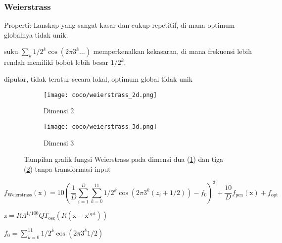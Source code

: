 \subsubsection*{Weierstrass}
\noindent Properti:
Lanskap yang sangat kasar dan cukup repetitif, di mana optimum globalnya tidak unik.
\begin{packed_item}
  \item suku $\sum_{k}^{}1/2^k\cos(2\pi 3^k\ldots)$ memperkenalkan kekasaran, di mana frekuensi lebih rendah memiliki bobot lebih besar $1/2^k$.
  \item diputar, tidak teratur secara lokal, optimum global tidak unik
\end{packed_item}
\begin{figure}[H]
	\centering
	\begin{subfigure}[b]{0.4\textwidth}
		\centering
		\texttt{[image: coco/weierstrass\_2d.png]}
		\caption{Dimensi 2}
		\label{fig:weierstrass_coco_2d}
	\end{subfigure}
	\hfill
	\begin{subfigure}[b]{0.4\textwidth}
		\centering
		\texttt{[image: coco/weierstrass\_3d.png]}
		\caption{Dimensi 3}
		\label{fig:weierstrass_coco_3d}
	\end{subfigure}
	\caption{Tampilan grafik fungsi Weierstrass pada dimensi dua (\cref{fig:weierstrass_coco_2d}) dan tiga (\cref{fig:weierstrass_coco_3d}) tanpa transformasi input}
	\label{fig:weierstrass_coco}
\end{figure}
\begin{equation}
  f_{\text{Weierstrass}}(\mathrm{x})=10(\frac{1}{D}\sum_{i=1}^{D}\sum_{k=0}^{11}1/2^k\cos(2\pi 3^k(z_i+1/2))-f_{0})^3+\frac{10}{D}f_{\text{pen}}(\mathrm{x})+f_{\text{opt}}
\end{equation}
\begin{packed_item}
    \item $\mathrm{z}=R\Lambda^{1/100}QT_{\text{osz}}(R(\mathrm{x}-\mathrm{x}^{\text{opt}}))$
    \item $f_0=\sum_{k=0}^{11}1/2^k\cos(2\pi 3^k1/2)$
\end{packed_item}